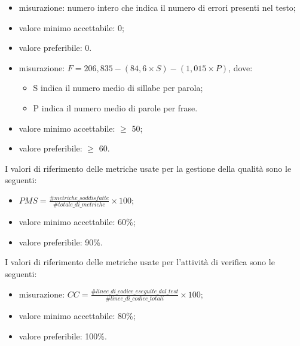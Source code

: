 			\begin{itemize}
				\item{misurazione: numero intero che indica il numero di errori presenti nel testo;}
				\item{valore minimo accettabile: 0;}
				\item{valore preferibile: 0.}
			\end{itemize}
		
			 \begin{itemize}
				\item{misurazione: $ F = 206,835 - (84,6 \times S) - (1,015 \times P) $, dove: 
				\begin{itemize}
					\item S indica il numero medio di sillabe per parola; 
					\item P indica il numero medio di parole per frase. 
				\end{itemize}}
				\item{valore minimo accettabile: $\geq$ 50;}
				\item{valore preferibile: $\geq$ 60.}
			\end{itemize}

	I valori di riferimento delle metriche usate per la gestione della qualità sono le seguenti:
	
			\begin{itemize}
				\item{$PMS=\displaystyle\frac{\#metriche\_soddisfatte}{\#totale\_di\_metriche} \times 100$;}
				\item{valore minimo accettabile: 60\%;}
				\item{valore preferibile: 90\%.}
			\end{itemize}
					
	I valori di riferimento delle metriche usate per l'attività di verifica sono le seguenti:
	
		 	\begin{itemize}
				\item{misurazione: $ CC = \displaystyle\frac{\#linee\_di\_codice\_eseguite\_dal\_test}{\#linee\_di\_codice\_totali} \times 100$;}
				\item{valore minimo accettabile: 80\%;}
				\item{valore preferibile: 100\%.}
			\end{itemize}

